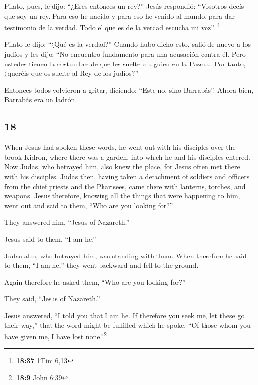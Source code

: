 \begin{paracol}{2}
 Pilato, pues, le dijo: ``¿Eres entonces un rey?'' Jesús
respondió: ``Vosotros decís que soy un rey. Para eso he nacido y para
eso he venido al mundo, para dar testimonio de la verdad. Todo el que es
de la verdad escucha mi voz''. \footnote{\textbf{18:37} 1Tim 6,13}

 Pilato le dijo: ``¿Qué es la verdad?'' Cuando hubo dicho
esto, salió de nuevo a los judíos y les dijo: ``No encuentro fundamento
para una acusación contra él.  Pero ustedes tienen la
costumbre de que les suelte a alguien en la Pascua. Por tanto, ¿queréis
que os suelte al Rey de los judíos?''

 Entonces todos volvieron a gritar, diciendo: ``Este no,
sino Barrabás''. Ahora bien, Barrabás era un ladrón.

\switchcolumn
\begin{otherlanguage}{english}

\hypertarget{section-35}{%
\section{18}\label{section-35}}

 When Jesus had spoken these words, he went out with his
disciples over the brook Kidron, where there was a garden, into which he
and his disciples entered.  Now Judas, who betrayed him,
also knew the place, for Jesus often met there with his disciples.
 Judas then, having taken a detachment of soldiers and
officers from the chief priests and the Pharisees, came there with
lanterns, torches, and weapons.  Jesus therefore, knowing
all the things that were happening to him, went out and said to them,
``Who are you looking for?''

 They answered him, ``Jesus of Nazareth.''

Jesus said to them, ``I am he.''

Judas also, who betrayed him, was standing with them. 
When therefore he said to them, ``I am he,'' they went backward and fell
to the ground.

 Again therefore he asked them, ``Who are you looking
for?''

They said, ``Jesus of Nazareth.''

 Jesus answered, ``I told you that I am he. If therefore
you seek me, let these go their way,''  that the word
might be fulfilled which he spoke, ``Of those whom you have given me, I
have lost none.''\footnote{\textbf{18:9} John 6:39}


\end{otherlanguage}
\end{paracol}
